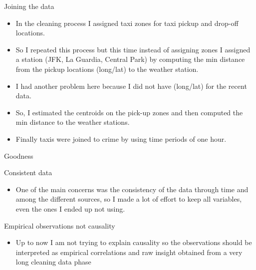 \documentclass[10pt,ignorenonframetext,]{beamer}
\providecommand{\tightlist}{%
  \setlength{\itemsep}{0pt}\setlength{\parskip}{0pt}}
\begin{document}
\begin{frame}

\begin{block}{Joining the data}

\begin{itemize}
\item
  In the cleaning process I assigned taxi zones for taxi pickup and
  drop-off locations.
\item
  So I repeated this process but this time instead of assigning zones I
  assigned a station (JFK, La Guardia, Central Park) by computing the
  min distance from the pickup locations (long/lat) to the weather
  station.
\item
  I had another problem here because I did not have (long/lat) for the
  recent data.
\item
  So, I estimated the centroids on the pick-up zones and then computed
  the min distance to the weather stations.
\item
  Finally taxis were joined to crime by using time periods of one hour.
\end{itemize}

\end{block}

\end{frame}

\begin{frame}{%
\protect\hypertarget{goodness}{%
Goodness}}

\begin{block}{Consistent data}

\begin{itemize}
\tightlist
\item
  One of the main concerns was the consistency of the data through time
  and among the different sources, so I made a lot of effort to keep all
  variables, even the ones I ended up not using.
\end{itemize}

\end{block}

\begin{block}{Empirical observations not causality}

\begin{itemize}
\tightlist
\item
  Up to now I am not trying to explain causality so the observations
  should be interpreted as empirical correlations and raw insight
  obtained from a very long cleaning data phase
\end{itemize}

\end{block}

\end{frame}
\end{document}
